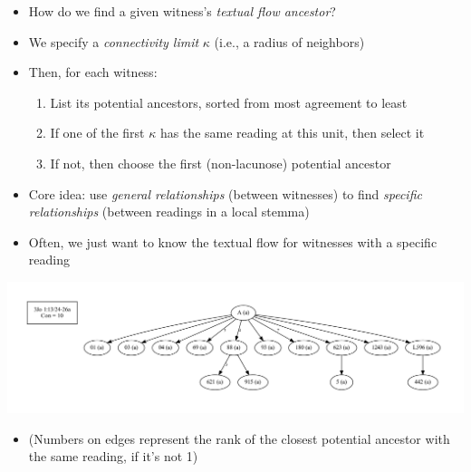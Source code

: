 \documentclass[10pt]{beamer}
\begin{document}
	\begin{frame}
		\begin{itemize}
			\item How do we find a given witness's \emph{textual flow ancestor}?
			\item We specify a \emph{connectivity limit} $\kappa$ (i.e., a radius of  neighbors)
			\item Then, for each witness:
			\begin{enumerate}
				\item List its potential ancestors, sorted from most agreement to least
				\item If one of the first $\kappa$ has the same reading at this unit, then select it
				\item If not, then choose the first (non-lacunose) potential ancestor
			\end{enumerate}
			\item Core idea: use \emph{general relationships} (between witnesses) to find \emph{specific relationships} (between readings in a local stemma)
		\end{itemize}
	\end{frame}
	\begin{frame}
		\begin{itemize}
			\item Often, we just want to know the textual flow for witnesses with a specific reading
		\end{itemize}
		\begin{center}
			\includegraphics[width=\textwidth]{../img/B25K1V13U24-26Ra-coherence-attestations.pdf}
		\end{center}
		\begin{itemize}
			\item (Numbers on edges represent the rank of the closest potential ancestor with the same reading, if it's not 1)
		\end{itemize}
	\end{frame}
\end{document}

